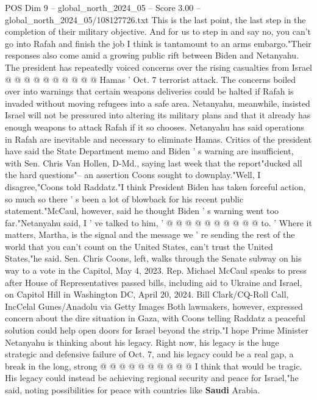 \begin{textsample}{POS Dim 9 – global\_north\_2024\_05 – Score 3.00 – global\_north\_2024\_05/108127726.txt}
This is the last point, the last step in the completion of their military objective.
And for us to step in and say no, you can't go into Rafah and finish the job I think is tantamount to an arms embargo."Their responses also come amid a growing public rift between Biden and Netanyahu.
The president has repeatedly voiced concerns over the rising casualties from Israel @ @ @ @ @ @ @ @ @ @ Hamas ' Oct. 7 terrorist attack.
The concerns boiled over into warnings that certain weapons deliveries could be halted if Rafah is invaded without moving refugees into a safe area.
Netanyahu, meanwhile, insisted Israel will not be pressured into altering its military plans and that it already has enough weapons to attack Rafah if it so chooses.
Netanyahu has said operations in Rafah are inevitable and necessary to eliminate Hamas.
Critics of the president have said the State Department memo and Biden ' s warning are insufficient, with Sen.
Chris Van Hollen, D-Md., saying last week that the report"ducked all the hard questions"-- an assertion Coons sought to downplay."Well, I disagree,"Coons told Raddatz."I think President Biden has taken forceful action, so much so there ' s been a lot of blowback for his recent public statement."McCaul, however, said he thought Biden ' s warning went too far."Netanyahu said, I ' ve talked to him, ' @ @ @ @ @ @ @ @ @ @ to. ' Where it matters, Martha, is the signal and the message we ' re sending the rest of the world that you can't count on the United States, can't trust the United States,"he said.
Sen.
Chris Coons, left, walks through the Senate subway on his way to a vote in the Capitol, May 4, 2023.
Rep.
Michael McCaul speaks to press after House of Representatives passed bills, including aid to Ukraine and Israel, on Capitol Hill in Washington DC, April 20, 2024.
Bill Clark/CQ-Roll Call, IncCelal Gunes/Anadolu via Getty Images Both lawmakers, however, expressed concern about the dire situation in Gaza, with Coons telling Raddatz a peaceful solution could help open doors for Israel beyond the strip."I hope Prime Minister Netanyahu is thinking about his legacy.
Right now, his legacy is the huge strategic and defensive failure of Oct. 7, and his legacy could be a real gap, a break in the long, strong @ @ @ @ @ @ @ @ @ @ I think that would be tragic.
His legacy could instead be achieving regional security and peace for Israel,"he said, noting possibilities for peace with countries like \textbf{Saudi} Arabia.

\end{textsample}
